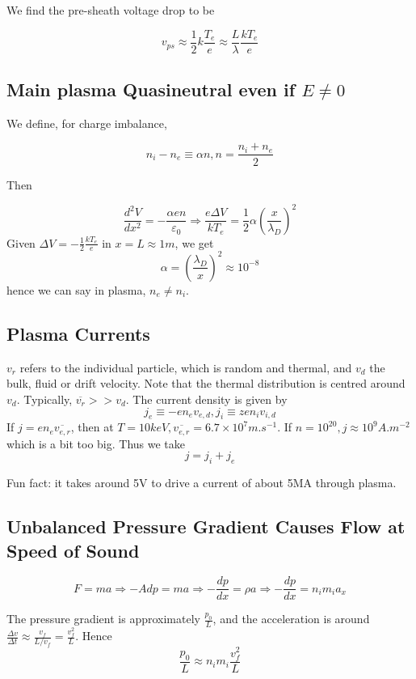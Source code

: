 \documentclass[12pt]{article}
\begin{document}
We find the pre-sheath voltage drop to be

$$v_{ps} \approx \frac{1}{2} k\frac{T_e}{e} \approx \frac{L}{\lambda} \frac{kT_e}{e}$$

\subsection{Main plasma Quasineutral even if $E \neq 0$}

We define, for charge imbalance,

$$n_i - n_e \equiv \alpha n, n = \frac{n_i+n_e}{2}$$

Then

$$\frac{d^2V}{dx^2} = -\frac{\alpha en}{\varepsilon_0} \Rightarrow \frac{e\Delta V}{kT_e} = \frac{1}{2} \alpha \left(\frac{x}{\lambda_D}\right)^2$$
Given $\Delta V = -\frac{1}{2} \frac{kT_e}{e}$ in $x = L \approx 1\unit{m}$, we get
$$\alpha = \left(\frac{\lambda_D}{x}\right)^2 \approx 10^{-8}$$
hence we can say in plasma, $n_e \neq n_i$.

\subsection{Plasma Currents}

$v_r$ refers to the individual particle, which is random and thermal, and $v_d$ the bulk, fluid or drift velocity. Note that the thermal distribution is centred around $v_d$. Typically, $\overline{v_r} >> v_d$. The current density is given by
$$j_e \equiv -en_ev_{e,d}, j_i \equiv zen_iv_{i,d}$$
If $j = en_e\overline{v_{e,r}}$, then at $T = 10\unit{keV}, \overline{v_{e,r}} = 6.7 \times 10^7 \unit{m.s^{-1}}$. If $n = 10^{20}, j \approx 10^9 \unit{A.m^{-2}}$ which is a bit too big. Thus we take
$$j = j_i + j_e$$

Fun fact: it takes around 5V to drive a current of about 5MA through plasma.

\subsection{Unbalanced Pressure Gradient Causes Flow at Speed of Sound}

$$F = ma \Rightarrow -Adp = ma \Rightarrow -\frac{dp}{dx} = \rho a \Rightarrow -\frac{dp}{dx} = n_im_ia_x$$

The pressure gradient is approximately $\frac{p_0}{L}$, and the acceleration is around $\frac{\Delta v}{\Delta t} \approx \frac{v_f}{L/v_f} = \frac{v_f^2}{L}$. Hence
$$\frac{p_0}{L} \approx n_im_i \frac{v_f^2}{L}$$
\end{document}
